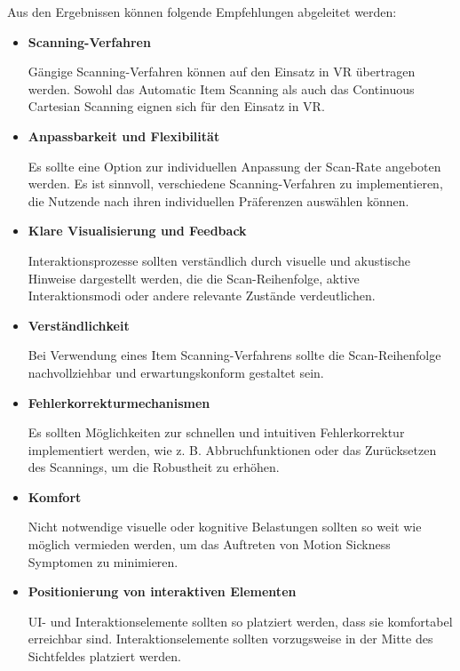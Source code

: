 Aus den Ergebnissen können folgende Empfehlungen abgeleitet werden:

\begin{itemize}
    \item \textbf{Scanning-Verfahren}
    
    Gängige Scanning-Verfahren können auf den Einsatz in VR übertragen werden. Sowohl das Automatic Item Scanning als auch das Continuous Cartesian Scanning eignen sich für den Einsatz in VR. 
    \item \textbf{Anpassbarkeit und Flexibilität}
    
    Es sollte eine Option zur individuellen Anpassung der Scan-Rate angeboten werden. Es ist sinnvoll, verschiedene Scanning-Verfahren zu implementieren, die Nutzende nach ihren individuellen Präferenzen auswählen können. 
    \item \textbf{Klare Visualisierung und Feedback}
    
    Interaktionsprozesse sollten verständlich durch visuelle und akustische Hinweise dargestellt werden, die die Scan-Reihenfolge, aktive Interaktionsmodi oder andere relevante Zustände verdeutlichen.
    \item \textbf{Verständlichkeit}
    
    Bei Verwendung eines Item Scanning-Verfahrens sollte die Scan-Reihenfolge nachvollziehbar und erwartungskonform gestaltet sein. 
    \item \textbf{Fehlerkorrekturmechanismen}
    
    Es sollten Möglichkeiten zur schnellen und intuitiven Fehlerkorrektur implementiert werden, wie z. B. Abbruchfunktionen oder das Zurücksetzen des Scannings, um die Robustheit zu erhöhen.
    \item \textbf{Komfort}
    
    Nicht notwendige visuelle oder kognitive Belastungen sollten so weit wie möglich vermieden werden, um das Auftreten von Motion Sickness Symptomen zu minimieren. 
    \item \textbf{Positionierung von interaktiven Elementen}
    
    UI- und Interaktionselemente sollten so platziert werden, dass sie komfortabel erreichbar sind. Interaktionselemente sollten vorzugsweise in der Mitte des Sichtfeldes platziert werden. 
\end{itemize}

